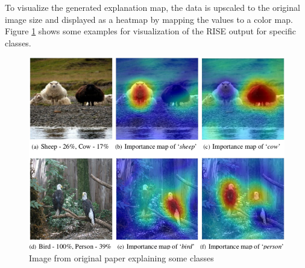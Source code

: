 To visualize the generated explanation map, the data is upscaled to the original image size and displayed as a heatmap by mapping the values to a color map. Figure \ref{rise_example} shows some examples for visualization of the RISE output for specific classes.

\begin{figure}[H]
\centering
\includegraphics[width=12cm]{chapters/02_methods/images/rise/sheep.png}
\caption{Image from original paper explaining some classes}
\label{rise_example}
\end{figure}
